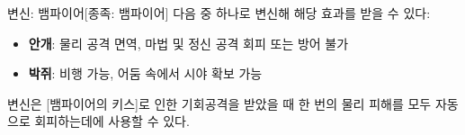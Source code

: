 \documentclass{report}
\begin{document}
	\begin{story}{변신: 뱀파이어}{[종족: 뱀파이어]}
		다음 중 하나로 변신해 해당 효과를 받을 수 있다:
		\begin{itemize}
			\item \textbf{안개}: 물리 공격 면역, 마법 및 정신 공격 회피 또는 방어 불가
			\item \textbf{박쥐}: 비행 가능, 어둠 속에서 시야 확보 가능
		\end{itemize}
		
		변신은 [뱀파이어의 키스]로 인한 기회공격을 받았을 때 한 번의 물리 피해를 모두 자동으로 회피하는데에 사용할 수 있다.
		
		\smallskip
		
	\end{story}
	
\end{document}
